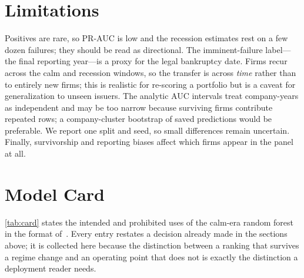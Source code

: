 \documentclass[manuscript,nonacm]{acmart}
\begin{document}
\section{Limitations}
Positives are rare, so PR-AUC is low and the recession estimates rest on a few dozen
failures; they should be read as directional. The imminent-failure label---the final
reporting year---is a proxy for the legal bankruptcy date. Firms recur across the calm
and recession windows, so the transfer is across \emph{time} rather than to entirely new
firms; this is realistic for re-scoring a portfolio but is a caveat for generalization
to unseen issuers. The analytic AUC intervals treat company-years as independent and
may be too narrow because surviving firms contribute repeated rows; a company-cluster
bootstrap of saved predictions would be preferable. We report one split and seed, so
small differences remain uncertain. Finally, survivorship and reporting biases affect
which firms appear in the panel at all.

\section{Model Card}
\cref{tab:card} states the intended and prohibited uses of the calm-era random forest in
the format of~\cite{mitchell2019modelcards}. Every entry restates a decision already
made in the sections above; it is collected here because the distinction between a
ranking that survives a regime change and an operating point that does not is exactly
the distinction a deployment reader needs.
\end{document}

